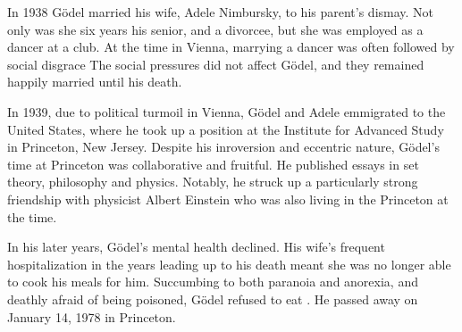 \documentclass[../../../include/open-logic-section]{subfiles}
\begin{document}
In 1938 G{\"o}del married his wife, Adele Nimbursky, to his parent's dismay. Not
only was she six years his senior, and a divorcee, but she was employed as
a dancer at a club. At the time in Vienna, marrying a dancer was often
followed by social disgrace \citep[34]{Dawson1997} The social pressures did not
affect G{\"o}del, and they remained happily married until his death.

In 1939, due to political turmoil in Vienna, G{\"o}del and Adele emmigrated to
the United States, where he took up a position at the Institute for
Advanced Study in Princeton, New Jersey. Despite his inroversion and
eccentric nature, G{\"o}del's time at Princeton was collaborative and fruitful.
He published essays in set theory, philosophy and physics. Notably, he
struck up a particularly strong friendship with physicist Albert Einstein
who was also living in the Princeton at the time.

In his later years, G{\"o}del's mental health declined. His wife's frequent
hospitalization in the years leading up to his death meant she was no
longer able to cook his meals for him. Succumbing to both paranoia and
anorexia, and deathly afraid of being poisoned, G{\"o}del refused to eat
\citep[251]{Dawson1997}. He passed away on January 14, 1978 in Princeton.
\end{document}
